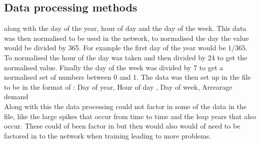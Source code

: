 \documentclass{IEEEtran}[11pt]
\begin{document}
\subsection{Data processing methods}
\begin{flushleft}
  along with the day of the year, hour of day and the day of the week. This data
  was then normalised to be used in the network, to normalised the day the value
  would be divided by 365. For example the first day of the year would be
  $1 / 365$. To normalised the hour of the day was taken and then divided by 24
  to get the normalised value. Finally the day of the week was divided by 7 to
  get a normalised set of numbers between 0 and 1. The data was then set up in
  the file to be in the format of : Day of year, Hour of day , Day of week,
  Arrearage demand
  \\
  \vspace{1.5mm}
  Along with this the data processing could not factor in some of the data in
  the file, like the large spikes that occur from time to time and the leap
  years that also occur. These could of been factor in but then would also would
  of need to be factored in to the network when training leading to more problems.
\end{flushleft}
\end{document}
